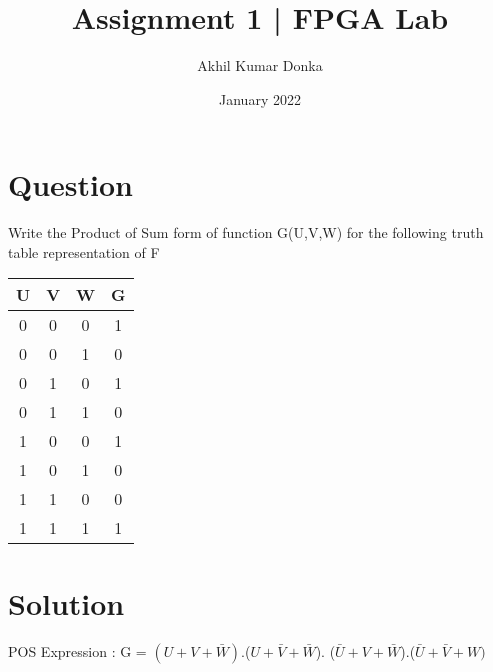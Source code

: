 \documentclass{article}
\title{Assignment 1 | FPGA Lab}
\author{Akhil Kumar Donka}
\date{January 2022}
\begin{document}
\maketitle

\section{Question}
Write the Product of Sum form of function G(U,V,W) for the following truth table representation of F

    \begin{table} [h!]
    \centering
    \begin{tabular}{ | c | c | c | c | }
    \hline
    U & V & W & G \\ [0.5ex]
     \hline
    0 & 0 & 0 & 1 \\
    0 & 0 & 1 & 0 \\
    0 & 1 & 0 & 1 \\
    0 & 1 & 1 & 0 \\
    1 & 0 & 0 & 1 \\
    1 & 0 & 1 & 0 \\
    1 & 1 & 0 & 0 \\
    1 & 1 & 1 & 1 \\ [1ex]
    \hline
    \end{tabular}
    \end{table}

\section{Solution}

POS Expression : G = $(U + V + \bar{W})$.($U+\bar{V}+\bar{W}$). ($\bar{U}+V+\bar{W}$).($\bar{U}+\bar{V}+W)$
\end{document}
